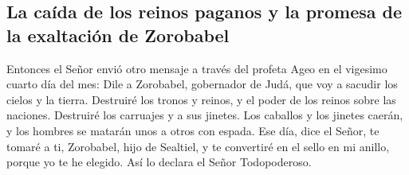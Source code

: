 \hypertarget{la-cauxedda-de-los-reinos-paganos-y-la-promesa-de-la-exaltaciuxf3n-de-zorobabel}{%
\subsection{La caída de los reinos paganos y la promesa de la exaltación
de
Zorobabel}\label{la-cauxedda-de-los-reinos-paganos-y-la-promesa-de-la-exaltaciuxf3n-de-zorobabel}}

 Entonces el Señor envió otro mensaje a través del
profeta Ageo en el vigesimo cuarto día del mes:  Dile a
Zorobabel, gobernador de Judá, que voy a sacudir los cielos y la tierra.
 Destruiré los tronos y reinos, y el poder de los reinos
sobre las naciones. Destruiré los carruajes y a sus jinetes. Los
caballos y los jinetes caerán, y los hombres se matarán unos a otros con
espada.  Ese día, dice el Señor, te tomaré a ti,
Zorobabel, hijo de Sealtiel, y te convertiré en el sello en mi anillo,
porque yo te he elegido. Así lo declara el Señor Todopoderoso.
